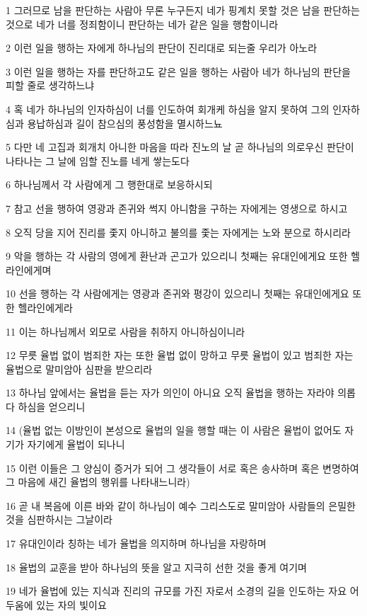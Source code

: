\par 1 그러므로 남을 판단하는 사람아 무론 누구든지 네가 핑계치 못할 것은 남을 판단하는 것으로 네가 너를 정죄함이니 판단하는 네가 같은 일을 행함이니라
\par 2 이런 일을 행하는 자에게 하나님의 판단이 진리대로 되는줄 우리가 아노라
\par 3 이런 일을 행하는 자를 판단하고도 같은 일을 행하는 사람아 네가 하나님의 판단을 피할 줄로 생각하느냐
\par 4 혹 네가 하나님의 인자하심이 너를 인도하여 회개케 하심을 알지 못하여 그의 인자하심과 용납하심과 길이 참으심의 풍성함을 멸시하느뇨
\par 5 다만 네 고집과 회개치 아니한 마음을 따라 진노의 날 곧 하나님의 의로우신 판단이 나타나는 그 날에 임할 진노를 네게 쌓는도다
\par 6 하나님께서 각 사람에게 그 행한대로 보응하시되
\par 7 참고 선을 행하여 영광과 존귀와 썩지 아니함을 구하는 자에게는 영생으로 하시고
\par 8 오직 당을 지어 진리를 좇지 아니하고 불의를 좇는 자에게는 노와 분으로 하시리라
\par 9 악을 행하는 각 사람의 영에게 환난과 곤고가 있으리니 첫째는 유대인에게요 또한 헬라인에게며
\par 10 선을 행하는 각 사람에게는 영광과 존귀와 평강이 있으리니 첫째는 유대인에게요 또한 헬라인에게라
\par 11 이는 하나님께서 외모로 사람을 취하지 아니하심이니라
\par 12 무릇 율법 없이 범죄한 자는 또한 율법 없이 망하고 무릇 율법이 있고 범죄한 자는 율법으로 말미암아 심판을 받으리라
\par 13 하나님 앞에서는 율법을 듣는 자가 의인이 아니요 오직 율법을 행하는 자라야 의롭다 하심을 얻으리니
\par 14 (율법 없는 이방인이 본성으로 율법의 일을 행할 때는 이 사람은 율법이 없어도 자기가 자기에게 율법이 되나니
\par 15 이런 이들은 그 양심이 증거가 되어 그 생각들이 서로 혹은 송사하며 혹은 변명하여 그 마음에 새긴 율법의 행위를 나타내느니라)
\par 16 곧 내 복음에 이른 바와 같이 하나님이 예수 그리스도로 말미암아 사람들의 은밀한 것을 심판하시는 그날이라
\par 17 유대인이라 칭하는 네가 율법을 의지하며 하나님을 자랑하며
\par 18 율법의 교훈을 받아 하나님의 뜻을 알고 지극히 선한 것을 좋게 여기며
\par 19 네가 율법에 있는 지식과 진리의 규모를 가진 자로서 소경의 길을 인도하는 자요 어두움에 있는 자의 빛이요
